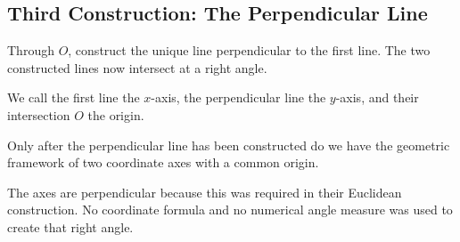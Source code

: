 \subsection{Third Construction: The Perpendicular Line}

\begin{derivationbox}
Through $O$, construct the unique line perpendicular to the first line. The two
constructed lines now intersect at a right angle.
\end{derivationbox}

\begin{definitionbox}
We call the first line the $x$-axis, the perpendicular line the $y$-axis, and
their intersection $O$ the origin.
\end{definitionbox}

\begin{center}
\end{center}

\begin{corebox}
Only after the perpendicular line has been constructed do we have the geometric
framework of two coordinate axes with a common origin.
\end{corebox}

\begin{remarkbox}
The axes are perpendicular because this was required in their Euclidean
construction. No coordinate formula and no numerical angle measure was used to
create that right angle.
\end{remarkbox}
